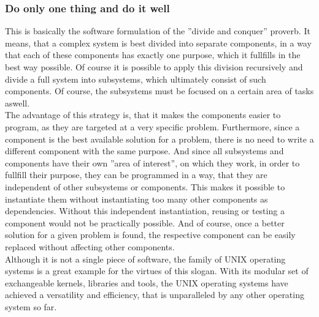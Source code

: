 		\subsubsection{Do only one thing and do it well}
			This is basically the software formulation of the ''divide and conquer'' proverb.
			It means, that a complex system is best divided into separate components, in a way that each of these components has exactly one purpose, which it fullfills in the best way possible.
			Of course it is possible to apply this division recursively and divide a full system into subsystems, which ultimately consist of such components.
			Of course, the subsystems must be focused on a certain area of tasks aswell.\\
			The advantage of this strategy is, that it makes the components easier to program, as they are targeted at a very specific problem.
			Furthermore, since a component is the best available solution for a problem, there is no need to write a different component with the same purpose.
			And since all subsystems and components have their own ''area of interest'', on which they work, in order to fullfill their purpose, they can be programmed in a way, that they are independent of other subsystems or components.
			This makes it possible to instantiate them without instantiating too many other components as dependencies.
			Without this independent instantiation, reusing or testing a component would not be practically possible.
			And of course, once a better solution for a given problem is found, the respective component can be easily replaced without affecting other components.\\
			Although it is not a single piece of software, the family of UNIX operating systems is a great example for the virtues of this slogan.
			With its modular set of exchangeable kernels, libraries and tools, the UNIX operating systems have achieved a versatility and efficiency, that is unparalleled by any other operating system so far.

